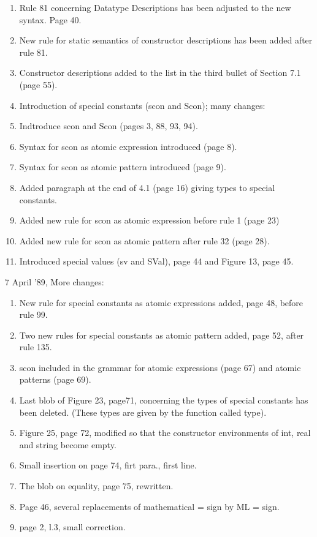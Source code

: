 \begin{description}
\begin{enumerate}
\item Rule 81 concerning Datatype Descriptions has been adjusted
      to the new syntax. Page 40.
\item New rule for static semantics of constructor descriptions has
      been added after rule 81.
\item Constructor descriptions added to the list in the third bullet 
      of Section 7.1 (page 55).
\item Introduction of special constants (scon and Scon); many changes:
\item Indtroduce scon and Scon (pages 3, 88, 93, 94).
\item Syntax for scon as atomic expression introduced (page 8).
\item Syntax for scon as atomic pattern introduced (page 9).
\item Added paragraph at the end of 4.1 (page 16) giving types
      to special constants.
\item Added new rule for scon as atomic expression before rule 1
      (page 23)
\item Added new rule for scon as atomic pattern after rule 32
      (page 28).
\item Introduced special values (sv and SVal), page 44 and Figure 13,
      page 45.
\end{enumerate}
\item{7 April '89,} More changes:
\begin{enumerate}
\item New rule for special constants as atomic expressions added, page 48,
      before rule 99.
\item Two new rules for special constants as atomic pattern added, page 52,
      after rule 135.
\item scon included in the grammar for atomic expressions (page 67) and
      atomic patterns (page 69).
\item Last blob of Figure 23, page71, concerning the types of special 
      constants has been deleted. (These types are given by the function
      called type).
\item Figure 25, page 72, modified so that the constructor environments
      of int, real and string become empty.
\item Small insertion on page 74, firt para., first line.
\item The blob on equality, page 75, rewritten.
\item Page 46, several replacements of mathematical = sign by ML = sign.
\item page 2, l.3,  small correction.

\end{enumerate}
\end{description}

